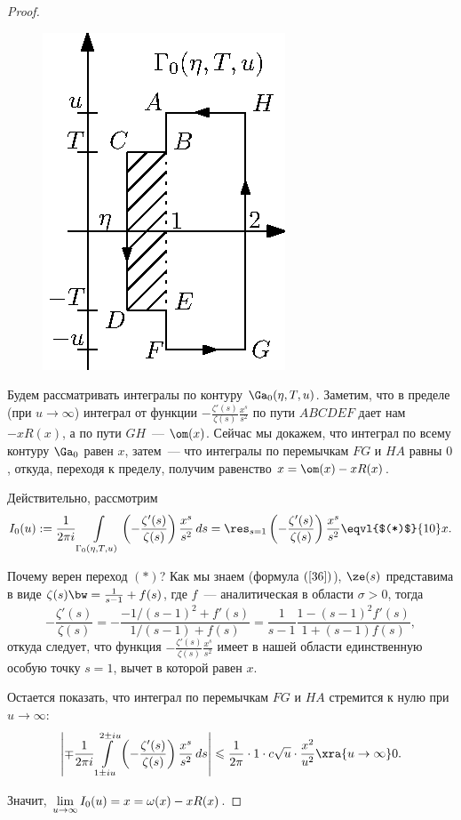 \begin{proof}
\begin{figure}
\begin{center}
\includegraphics[scale=1.0, trim=20 0 0 0]{pics/05022}
\end{center}
\end{figure}

Будем рассматривать интегралы по контуру $\Ga_0(\eta,T,u)$. Заметим, что 
в пределе (при $u\to\infty$) интеграл от функции $-\frac{\zeta '(s)}{\zeta 
(s)} \frac{x^s}{s^2}$ по пути $ABCDEF$ дает нам $-xR(x)$, а по пути $GH$~—
$\om(x)$. Сейчас мы докажем, что интеграл по всему контуру $\Ga_0$ равен $x$, 
затем~— что интегралы по перемычкам $FG$ и $HA$ равны $0$, откуда, переходя 
к пределу, получим равенство $x = \om(x) - xR(x)$.

Действительно, рассмотрим
$$I_0(u):=\frac{1}{2\pi i} \int\limits_{\Gamma_0(\eta,T,u)}
\left(-\frac{\zeta '(s)}{\zeta (s)}\right)\frac{x^{s}}{s^2}\,ds = 
\res_{s=1} \left(-\frac{\zeta '(s)}{\zeta (s)}\right)\frac{x^s}{s^2}
\eqvl{$(*)$}{10}x.$$

Почему верен переход $(*)$? Как мы знаем (формула $(\ref{36})$), $\ze(s)$ 
представима в виде $\zeta(s) \bw= \frac{1}{s-1} + f(s)$, где $f$~— 
аналитическая в области $\sigma > 0$, тогда
$$-\frac{\zeta '(s)}{\zeta (s)} = -\frac{-1/(s-1)^2 + f'(s)}{1/(s-1) + f(s)} = 
\frac{1}{s-1}\frac{1 - (s-1)^2f'(s)}{1 + (s-1)f(s)},$$
откуда следует, что функция $-\frac{\zeta '(s)}{\zeta (s)} \frac{x^s}{s^2}$
имеет в нашей области единственную особую точку $s=1$, вычет в которой равен 
$x$.

Остается показать, что интеграл по перемычкам $FG$ и $HA$ стремится к нулю 
при $u\to\infty$:
$$\left|\mp\frac{1}{2\pi i} \int\limits_{1 \pm iu}^{2\pm iu}
\left(-\frac{\zeta '(s)}{\zeta (s)}\right)\frac{x^s}{s^2}\,ds\right| \leqslant
\frac{1}{2\pi}\cdot 1\cdot c\sqrt{u}\cdot\frac{x^2}{u^2} \xra{u\to\infty} 0.$$

Значит, $\lim\limits_{u\to\infty}I_0(u) =x= \omega(x) - xR(x)$.
\end{proof}

